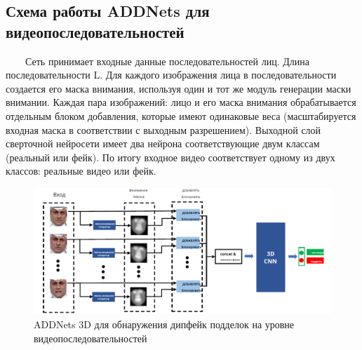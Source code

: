 \documentclass[12pt]{article}
\begin{document}
    \subsection{Схема работы ADDNets для видеопоследовательностей}
        $\qquad$Сеть принимает входные данные последовательностей лиц. Длина последовательности L. Для каждого изображения лица в последовательности создается его маска внимания, используя один и тот же модуль генерации маски внимании. Каждая пара изображений: лицо и его маска внимания обрабатывается отдельным блоком добавления, которые имеют одинаковые веса (масштабируется входная маска в соответствии с выходным разрешением).
        Выходной слой сверточной нейросети имеет два нейрона соответствующие двум классам (реальный или фейк). По итогу входное видео соответствует одному из двух классов: реальные видео или фейк.
        \begin{figure}[h!]
            \centering
            \includegraphics[width = 520 pt] {19.png}
            \caption{ADDNets 3D для обнаружения дипфейк подделок на уровне видеопоследовательностей}
        \end{figure}
        \newpage
\end{document}
